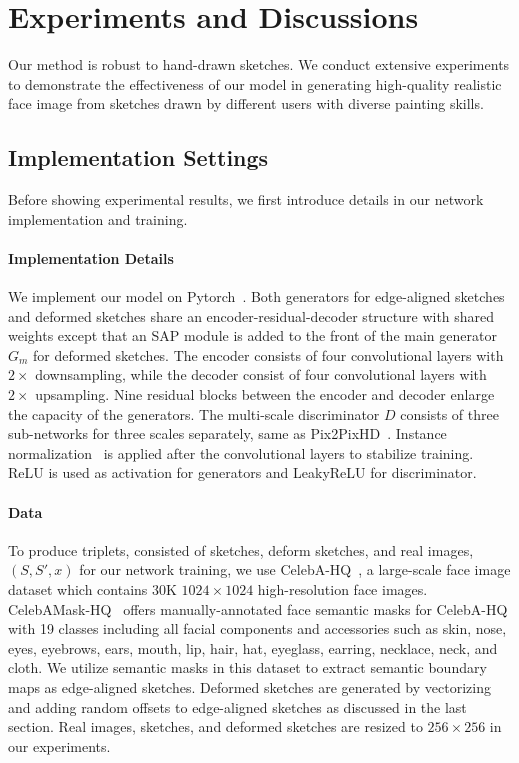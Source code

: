 \section{Experiments and Discussions}
\label{sec:experiments}

Our method is robust to hand-drawn sketches. We conduct extensive experiments to demonstrate the effectiveness of our model in generating high-quality realistic face image from sketches drawn by different users with diverse painting skills.  


\subsection{Implementation Settings}
Before showing experimental results, we first introduce details in our network implementation and training. 


\paragraph{Implementation Details}
We implement our model on Pytorch~\cite{Pytorch}. Both generators for edge-aligned sketches and deformed sketches share an encoder-residual-decoder structure with shared weights except that an SAP module is added to the front of the main generator $G_m$ for deformed sketches. 
The encoder consists of four convolutional layers with $2\times$ downsampling, while the decoder consist of four convolutional layers with $2\times$ upsampling. 
Nine residual blocks between the encoder and decoder enlarge the capacity of the generators. 
The multi-scale discriminator $D$ consists of three sub-networks for three scales separately, same as Pix2PixHD~\cite{pix2pixHD}. 
Instance normalization~\cite{IN} is applied after the convolutional layers to stabilize training. 
ReLU is used as activation for generators and LeakyReLU for discriminator. 
%
\paragraph{Data}
To produce triplets, consisted of sketches, deform sketches, and real images, $(S, S', x)$ for our network training, we use 
CelebA-HQ~\cite{PGGAN}, a large-scale face image dataset which contains 30K $1024\times1024$ high-resolution face images. 
%
CelebAMask-HQ~\cite{CelebAMask-HQ} offers manually-annotated face semantic masks for CelebA-HQ with 19 classes including all facial components and accessories such as skin, nose, eyes, eyebrows, ears, mouth, lip, hair, hat, eyeglass, earring, necklace, neck, and cloth. We utilize semantic masks in this dataset to extract semantic boundary maps as edge-aligned sketches. 
Deformed sketches are generated by vectorizing and adding random offsets to edge-aligned sketches as discussed in the last section.
Real images, sketches, and deformed sketches are resized to $256\times256$ in our experiments.


